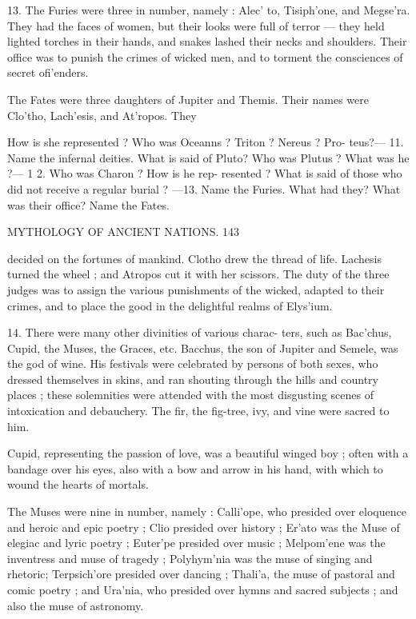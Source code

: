 \documentclass[openany,a4paper]{memoir}
\begin{document}
13. The Furies were three in number, namely : Alec' to, 
Tisiph'one, and Megse'ra. They had the faces of women, 
but their looks were full of terror — they held lighted torches 
in their hands, and snakes lashed their necks and shoulders. 
Their office was to punish the crimes of wicked men, and to 
torment the consciences of secret ofi'enders. 

The Fates were three daughters of Jupiter and Themis. 
Their names were Clo'tho, Lach'esis, and At'ropos. They 

How is she represented ? Who was Oceanns ? Triton ? Nereus ? Pro- 
teus?— 11. Name the infernal deities. What is said of Pluto? Who 
was Plutus ? What was he ?— 1 2. Who was Charon ? How is he rep- 
resented ? What is said of those who did not receive a regular burial ? 
—13. Name the Furies. What had they? What was their office? 
Name the Fates. 



MYTHOLOGY OF ANCIENT NATIONS. 143 

decided on the fortunes of mankind. Clotho drew the thread 
of life. Lachesis turned the wheel ; and Atropos cut it 
with her scissors. The duty of the three judges was to 
assign the various punishments of the wicked, adapted to 
their crimes, and to place the good in the delightful realms 
of Elys'ium. 

14. There were many other divinities of various charac- 
ters, such as Bac'chus, Cupid, the Muses, the Graces, etc. 
Bacchus, the son of Jupiter and Semele, was the god of 
wine. His festivals were celebrated by persons of both 
sexes, who dressed themselves in skins, and ran shouting 
through the hills and country places ; these solemnities were 
attended with the most disgusting scenes of intoxication and 
debauchery. The fir, the fig-tree, ivy, and vine were sacred 
to him. 

Cupid, representing the passion of love, was a beautiful 
winged boy ; often with a bandage over his eyes, also with 
a bow and arrow in his hand, with which to wound the 
hearts of mortals. 

The Muses were nine in number, namely : Calli'ope, who 
presided over eloquence and heroic and epic poetry ; Clio 
presided over history ; Er'ato was the Muse of elegiac and 
lyric poetry ; Euter'pe presided over music ; Melpom'ene 
was the inventress and muse of tragedy ; Polyhym'nia was 
the muse of singing and rhetoric; Terpsich'ore presided 
over dancing ; Thali'a, the muse of pastoral and comic 
poetry ; and Ura'nia, who presided over hymns and sacred 
subjects ; and also the muse of astronomy. 
\end{document}
